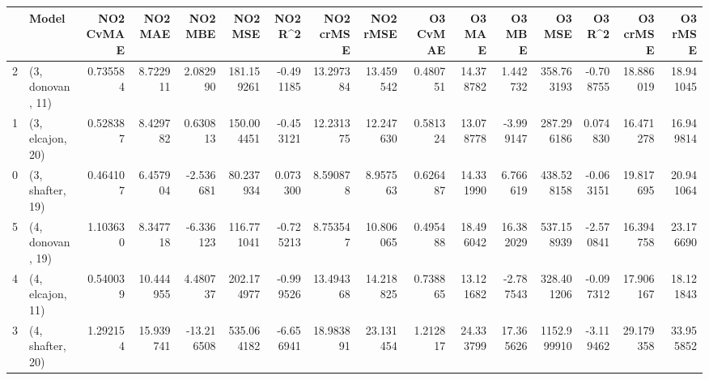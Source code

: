 \begin{tabular}{llrrrrrrrrrrrrrr}
\toprule
{} &             Model &  NO2 CvMAE &    NO2 MAE &    NO2 MBE &     NO2 MSE &   NO2 R\textasciicircum2 &  NO2 crMSE &   NO2 rMSE &  O3 CvMAE &     O3 MAE &     O3 MBE &       O3 MSE &    O3 R\textasciicircum2 &   O3 crMSE &    O3 rMSE \\
\midrule
2 &  (3, donovan, 11) &   0.735584 &   8.722911 &   2.082990 &  181.159261 & -0.491185 &  13.297384 &  13.459542 &  0.480751 &  14.378782 &   1.442732 &   358.763193 & -0.708755 &  18.886019 &  18.941045 \\
1 &  (3, elcajon, 20) &   0.528387 &   8.429782 &   0.630813 &  150.004451 & -0.453121 &  12.231375 &  12.247630 &  0.581324 &  13.078778 &  -3.999147 &   287.296186 &  0.074830 &  16.471278 &  16.949814 \\
0 &  (3, shafter, 19) &   0.464107 &   6.457904 &  -2.536681 &   80.237934 &  0.073300 &   8.590878 &   8.957563 &  0.626487 &  14.331990 &   6.766619 &   438.528158 & -0.063151 &  19.817695 &  20.941064 \\
5 &  (4, donovan, 19) &   1.103630 &   8.347718 &  -6.336123 &  116.771041 & -0.725213 &   8.753547 &  10.806065 &  0.495488 &  18.496042 &  16.382029 &   537.158939 & -2.570841 &  16.394758 &  23.176690 \\
4 &  (4, elcajon, 11) &   0.540039 &  10.444955 &   4.480737 &  202.174977 & -0.999526 &  13.494368 &  14.218825 &  0.738865 &  13.121682 &  -2.787543 &   328.401206 & -0.097312 &  17.906167 &  18.121843 \\
3 &  (4, shafter, 20) &   1.292154 &  15.939741 & -13.216508 &  535.064182 & -6.656941 &  18.983891 &  23.131454 &  1.212817 &  24.333799 &  17.365626 &  1152.999910 & -3.119462 &  29.179358 &  33.955852 \\
\bottomrule
\end{tabular}
